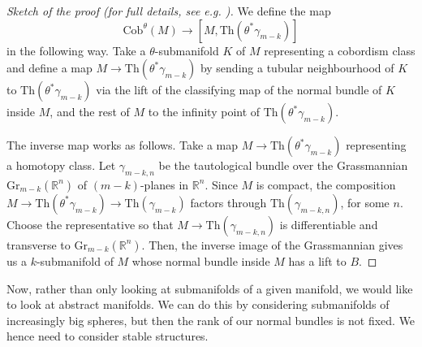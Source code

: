 \documentclass[a4paper, 11pt,reqno]{amsart}
\theoremstyle{plain}
\theoremstyle{definition}
\newtheorem{definition}[theorem]{Definition}
\newtheorem{example}[theorem]{Example}
\newcommand{\Th}{\mathrm{Th}}
\begin{document}
\begin{proof}[Sketch of the proof (for full details, see e.g. {\cite[Section 8]{Wallbook}})]
We define the map \[\mathrm{Cob}^\theta(M)\to [M, \Th(\theta^\ast\gamma_{m-k})]\] in the following way. Take a $\theta$-submanifold $K$ of $M$ representing a cobordism class and define a map $M\to \Th(\theta^\ast\gamma_{m-k})$ by sending a tubular neighbourhood of $K$ to $\Th(\theta^\ast\gamma_{m-k})$ via the lift of the classifying map of the normal bundle of $K$ inside $M$, and the rest of $M$ to the infinity point of $\Th(\theta^\ast\gamma_{m-k})$.\par
The inverse map works as follows. Take a map $M\to\Th(\theta^\ast\gamma_{m-k})$ representing a homotopy class. Let $\gamma_{m-k,n}$ be the tautological bundle over the Grassmannian $\mathrm{Gr}_{m-k}(\mathbb{R}^n)$ of $(m-k)$-planes in $\mathbb{R}^n$. Since $M$ is compact, the composition $M\to \Th(\theta^\ast\gamma_{m-k})\to\Th(\gamma_{m-k})$ factors through $\Th(\gamma_{m-k,n})$, for some $n$. Choose the representative so that $M\to \Th(\gamma_{m-k,n})$ is differentiable and transverse to $\mathrm{Gr}_{m-k}(\mathbb{R}^n)$. Then, the inverse image of the Grassmannian gives us a $k$-submanifold of $M$ whose normal bundle inside $M$ has a lift to $B$.\end{proof}
Now, rather than only looking at submanifolds of a given manifold, we would like to look at abstract manifolds. We can do this by considering submanifolds of increasingly big spheres, but then the rank of our normal bundles is not fixed. We hence need to consider stable structures.
\end{document}
